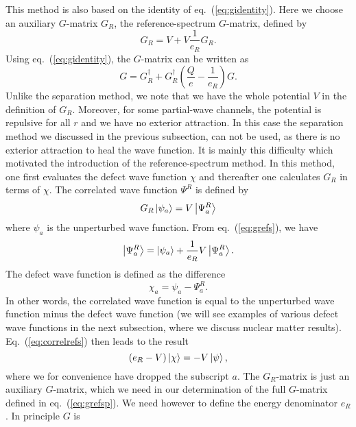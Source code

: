 This method is also based on the identity of eq.\ (\ref{eq:gidentity}).
Here we choose an auxiliary $G$-matrix $G_R$, the reference-spectrum
$G$-matrix, defined by
\begin{equation}
     G_R=V+V\frac{1}{e_R}G_R.
     \label{eq:grefs}
\end{equation}
Using eq.\ (\ref{eq:gidentity}), the $G$-matrix can be written as
\begin{equation}
  G=G_R^{\dagger}+G_R^{\dagger}\left(\frac{Q}{e}-\frac{1}{e_R}\right)G.
  \label{eq:grefsp}
\end{equation}
Unlike the separation method, we note that we have the whole potential
$V$ in the definition of $G_R$. Moreover, for some partial-wave channels,
the potential is repulsive for all $r$ and we have no exterior attraction. 
In this case the separation method we discussed in the previous subsection,
can not be used, as there is no exterior attraction to heal the wave 
function. It is mainly this difficulty which motivated the introduction
of the reference-spectrum method. In this method, one first evaluates the
defect wave function $\chi$ and thereafter one calculates $G_R$ in terms
of $\chi$.
The correlated wave function $\Psi^R$ is defined by
\begin{equation}
     G_R\left| \psi_a \right\rangle=V\left| \Psi_a^R \right\rangle
\end{equation}
where $\psi_a$ is the unperturbed wave function. From eq.\ (\ref{eq:grefs}),
we have
\begin{equation}
      \left| \Psi_a^R \right\rangle=\left| \psi_a \right\rangle+\frac{1}{e_R}V\left| \Psi_a^R \right\rangle.
      \label{eq:correlrefs}
\end{equation}
The defect wave function is defined as the difference
\begin{equation}
     \chi_a=\psi_a-\Psi_a^R.
\end{equation}
In other words, the correlated wave function is equal to the
unperturbed wave function minus the defect wave function (we will see 
examples of various defect wave functions in the next subsection, where
we discuss nuclear matter results).
Eq.\ (\ref{eq:correlrefs}) then leads to the result
\begin{equation}
   (e_R-V)\left| \chi \right\rangle=-V\left| \psi \right\rangle,
   \label{eq:refspeq}
\end{equation}
where we for convenience have dropped the subscript $a$. The $G_R$-matrix
is just an auxiliary $G$-matrix, which we need in our determination of the
full $G$-matrix defined in eq.\ (\ref{eq:grefsp}). We need however to
define the energy denominator $e_R$. In principle $G$ is
